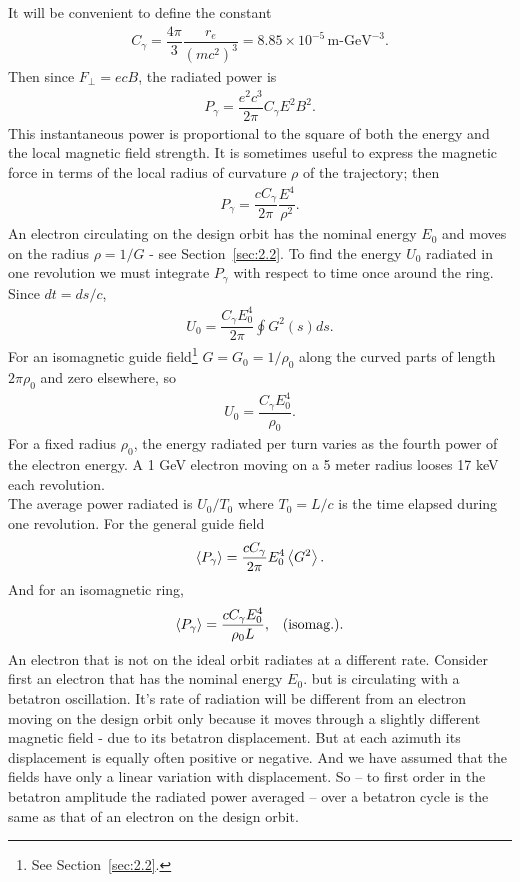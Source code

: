 It will be convenient to define the constant
\begin{align} \label{eq:4.2}
	C_\gamma = \dfrac{4 \pi}{3} \dfrac{r_e}{(m c^2)^3} = 8.85 \times 10^{-5}\, \text{m-GeV}^{-3}.
\end{align}
Then since $F_\perp = ecB$, the radiated power is
\begin{align} \label{eq:4.3}
	P_\gamma = \dfrac{e^2 c^3}{2 \pi} C_\gamma E^2 B^2.
\end{align}
This instantaneous power is proportional to the square of both the energy and the local magnetic field strength. It is sometimes useful to express the magnetic force in terms of the local radius of curvature $\rho$ of the trajectory; then
\begin{align} \label{eq:4.4}
	P_\gamma = \dfrac{c C_\gamma}{2 \pi}\dfrac{E^4}{\rho^2}.
\end{align}
An electron circulating on the design orbit has the nominal energy $E_0$ and moves on the radius $\rho = 1/G$ - see Section~\ref{sec:2.2}. To find the energy $U_0$ radiated in one revolution
 we must integrate $P_\gamma$ with respect to time once around the ring. Since $dt = ds/c$,
\begin{align}
	U_0 = \dfrac{C_\gamma E_0^4}{2 \pi} \oint G^2(s) ds.
\end{align}
For an isomagnetic guide field\footnote{See Section~\ref{sec:2.2}.} $G = G_0 = 1/\rho_0$ along the curved parts of length $2 \pi \rho_0$ and zero elsewhere, so
\begin{align} \label{eq:4.8}
	U_0 = \dfrac{C_\gamma E_0^4}{\rho_0}.
\end{align}
For a fixed radius $\rho_0$, the energy radiated per turn varies as the fourth power of the electron energy. A 1 GeV electron moving on a 5 meter radius looses 17 keV each revolution.\\
The average power radiated is $U_0/T_0$ where $T_0= L/c$ is the time elapsed during one revolution. For the general guide field
\begin{align} \label{eq:4.9}
	\left< P_\gamma \right> = \dfrac{cC_\gamma}{2\pi} E_0^4 \left< G^2 \right>.
\end{align}
And for an isomagnetic ring,
\begin{align} \label{eq:4.10}
	\left< P_\gamma \right> = \dfrac{c C_\gamma E_0^4}{\rho_0 L}, && \text{(isomag.).}
\end{align}
An electron that is not on the ideal orbit radiates at a different rate. Consider first an electron that has the nominal energy $E_0$. but is circulating with a betatron oscillation. It's rate of radiation will be different from an electron moving on the design orbit only because it moves through a slightly different magnetic field - due to its betatron displacement. But at each azimuth its displacement is equally often positive or negative. And we have assumed that the fields have only a linear variation with displacement. So -- to first order in the betatron amplitude the radiated power averaged -- over a betatron cycle is the same as that of an electron on the design orbit.\\
